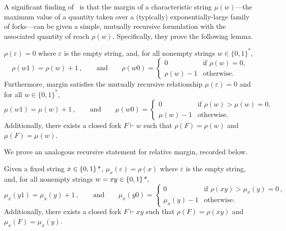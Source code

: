 A significant finding of~\citet{KRDO17} is that the margin of a
characteristic string $\mu(w)$---the maximum value of a quantity taken
over a (typically) exponentially-large family of forks---can be given
a simple, mutually recursive formulation with the associated quantity
of reach $\rho(w)$. Specifically, they prove the following lemma.

\begin{lemma}\label{lem:margin} 
  $\rho(\varepsilon) = 0$ 
  where $\varepsilon$ is the empty string, and, for all nonempty strings $w\in\{0,1\}^*$,
  \begin{equation}
    \rho(w1) = \rho(w)+1\,, \qquad\text{and}\qquad
    \rho(w0) = \begin{cases} 0 & \text{if $\rho(w) = 0$,}\\
      \rho(w)-1 & \text{otherwise.}
    \end{cases}
		\label{eq:rho-recursive}
  \end{equation}
  Furthermore, margin satisfies the mutually recursive relationship
  $\mu(\varepsilon) = 0$ and for all $w \in \{0,1\}^*$,
  \begin{equation}
    \mu(w1) = \mu(w)+1\,,\qquad\text{and}\qquad
    \mu(w0) = \begin{cases}
      0 & \text{if $\rho(w)>\mu(w)=0$,} \\
      \mu(w)-1 & \text{otherwise.}
    \end{cases}
		\label{eq:mu-recursive}
  \end{equation}
  Additionally, there exists a closed fork $F\vdash w$ such that
  $\rho(F)=\rho(w)$ and $\mu(F)=\mu(w)$.
\end{lemma}

We prove an analogous recursive statement for relative margin, recorded below.

\begin{lemma}\label{lem:relative-margin}
  Given a fixed string $x\in\{0,1\}\text{\emph{*}}$,
  $\mu_x(\varepsilon) =\rho(x)$ 
  where $\varepsilon$ is the empty string, and, for all nonempty strings $w=xy\in\{0,1\}\text{\emph{*}},$
  \begin{equation}
    \mu_x(y1)= \mu_x(y)+1\,,\qquad\text{and}\qquad
    \mu_x(y0)= \begin{cases}
      0 & \text{if } \rho(xy) > \mu_x(y)=0\,, \\
      \mu_x(y)-1 & \text{otherwise.}
    \end{cases}
		\label{eq:mu-relative-recursive}
  \end{equation}
  Additionally, there exists a closed fork $F\vdash xy$ such that
  $\rho(F)=\rho(xy)$ and $\mu_x(F)=\mu_x(y)$.
\end{lemma}

